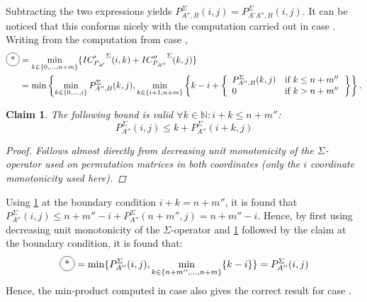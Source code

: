 \documentclass[twoside,11pt,openright]{report}
\newcommand*{\circled}[1]{\tikz[baseline=(char.base)]{
                          \node[shape=circle,draw,inner sep=2pt] (char) {#1};}}
\newtheorem{claim}{Claim}
\begin{document}
Subtracting the two expressions yields $P_{A'',B}^{\Sigma}(i, j) = P_{A'A'',B}^{\Sigma}(i, j)$. It can be noticed that this conforms nicely with the computation carried out in case \circled{1}. Writing from the computation from case \circled{1},
\begin{align*}
  \circled{*} &= \min_{k \in \{0,\dots,n+m\}} \{ {IC'_{P_{A'}}}^{\Sigma}(i, k) + {IC''_{P_{A''}}}^{\Sigma}(k, j) \} \\
  &= \min\left\{
       \min_{k \in \{0,\dots,i\}}{P_{A'',B}^{\Sigma}(k, j)},
       \min_{k \in \{i + 1, n + m\}}\left\{ k - i + \left\{ %
        \begin{array}{ll}
          P_{A'',B}^{\Sigma}(k, j) & \text{if } k \leq n + m'' \\
          0                        & \text{if } k > n + m''
        \end{array}
       \right. \right\}
     \right\}.
\end{align*}
%
\begin{claim}
  \label{claim:bounding-sigma}
  The following bound is valid $\forall k \in \mathbb{N}: i + k \leq n + m''$:
  \[
    P_{A''}^{\Sigma}(i, j) \leq k + P_{A''}^{\Sigma}(i + k, j)
  \]
  \begin{proof}
    Follows almost directly from decreasing unit monotonicity of the $\Sigma$-operator used on permutation matrices in both coordinates (only the $i$ coordinate monotonicity used here).
  \end{proof}
\end{claim}
Using \cref{claim:bounding-sigma} at the boundary condition $i + k = n + m''$, it is found that $P_{A''}^{\Sigma}(i, j) \leq n + m'' - i + P_{A''}^{\Sigma}(n + m'', j) = n + m'' - i$. Hence, by first using decreasing unit monotonicity of the $\Sigma$-operator and \cref{claim:bounding-sigma} followed by the claim at the boundary condition, it is found that:
\[
  \circled{*} = \min\{ P_{A''}^{\Sigma}(i, j), \min_{k \in \{n+m'', \dots, n+m\}} \{ k - i \} \}
              = P_{A''}^{\Sigma}(i, j)
\]
Hence, the min-product computed in case \circled{3} also gives the correct result for case \circled{1}.
\end{document}
